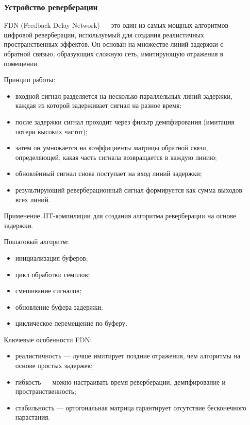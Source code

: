 \subsubsection{Устройство реверберации}

FDN (Feedback Delay Network) — это один из самых мощных алгоритмов цифровой реверберации, используемый для создания реалистичных пространственных эффектов. Он основан на множестве линий задержки с обратной связью, образующих сложную сеть, имитирующую отражения в помещении.

Принцип работы:
\begin{itemize}
	\item входной сигнал разделяется на несколько параллельных линий задержки, каждая из которой задерживает сигнал на разное время;
	\item после задержки сигнал проходит через фильтр демпфирования (имитация потери высоких частот);
	\item затем он умножается на коэффициенты матрицы обратной связи, определяющей, какая часть сигнала возвращается в каждую линию;
	\item обновлённый сигнал снова поступает на вход линий задержки;
	\item результирующий реверберационный сигнал формируется как сумма выходов всех линий.
\end{itemize}

Применение JIT-компиляции для создания алгоритма реверберации на основе задержки.

Пошаговый алгоритм:
\begin{itemize}
	\item инициализация буферов;
	\item цикл обработки семплов;
	\item смешивание сигналов;
	\item обновление буфера задержки;
	\item циклическое перемещение по буферу.
\end{itemize}

Ключевые особенности FDN:
\begin{itemize}
	\item реалистичность — лучше имитирует поздние отражения, чем алгоритмы на основе простых задержек;
	\item гибкость — можно настраивать время реверберации, демпфирование и пространственность;
	\item стабильность — ортогональная матрица гарантирует отсутствие бесконечного нарастания.
\end{itemize}

